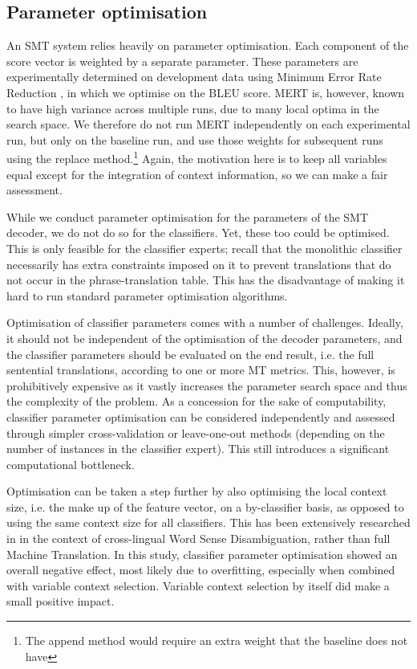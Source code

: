 \documentclass[smallextended]{svjour3}       %
\theoremstyle{break}
\begin{document}
\subsection{Parameter optimisation}
\label{sec:paropt}

An SMT system relies heavily on parameter optimisation. Each component of the
score vector is weighted by a separate parameter. These parameters are
experimentally determined on development data using Minimum Error Rate
Reduction \citep{MERT}, in which we optimise on the BLEU score. MERT is,
however, known to have high variance across multiple runs, due to many local
optima in the search space. We therefore do not run MERT independently on each
experimental run, but only on the baseline run, and use those weights for
subsequent runs using the replace method.\footnote{The append method would
require an extra weight that the baseline does not have} Again, the motivation
here is to keep all variables equal except for the integration of context
information, so we can make a fair assessment.

While we conduct parameter optimisation for the parameters of the SMT
decoder, we do not do so for the classifiers. Yet, these too could
be optimised. This is only feasible for the classifier experts; recall
that the monolithic classifier necessarily has extra constraints
imposed on it to prevent translations that do not occur in the
phrase-translation table. This has the disadvantage of making it hard
to run standard parameter optimisation algorithms.

Optimisation of classifier parameters comes with a number of challenges.
Ideally, it should not be independent of the optimisation of the decoder
parameters, and the classifier parameters should be evaluated on the
end result, i.e. the full sentential translations, according to one or more MT
metrics. This, however, is prohibitively expensive as it vastly increases the
parameter search space and thus the complexity of the problem. As a concession
for the sake of computability, classifier parameter optimisation can be considered
independently and assessed through simpler cross-validation or leave-one-out
methods (depending on the number of instances in the classifier expert).  This
still introduces a significant computational bottleneck.  

Optimisation can be taken a step further by also optimising the local context
size, i.e. the make up of the feature vector, on a by-classifier basis, as
opposed to using the same context size for all classifiers. This has been
extensively researched in \cite{WSD2} in the context of cross-lingual Word
Sense Disambiguation, rather than full Machine Translation. In this study,
classifier parameter optimisation showed an overall negative effect, most
likely due to overfitting, especially when combined with variable context
selection. Variable context selection by itself did make a small positive
impact.
\end{document}
